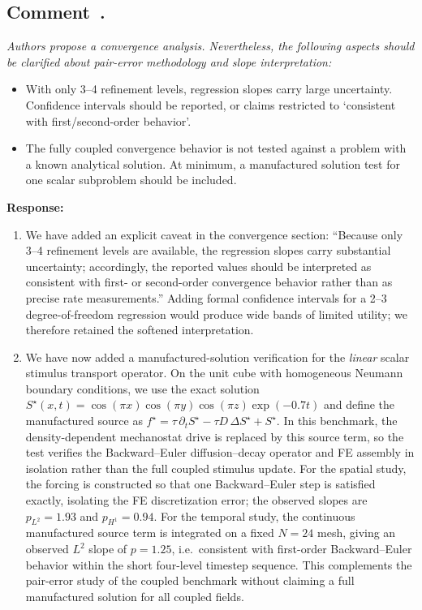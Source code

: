\documentclass[11pt,a4paper]{article}
\newcounter{reviewer}
\newcounter{comment}[reviewer]
\newcommand{\revcomment}[1]{%
  \refstepcounter{comment}%
  \subsection*{Comment~\thereviewer.\thecomment}%
  {\color{reviewerblue}\itshape #1}%
  \medskip
}
\newcommand{\response}{%
  \par\noindent\textbf{Response:}\par\noindent\color{responseblack}%
}
\begin{document}

\revcomment{Authors propose a convergence analysis. Nevertheless, the following aspects should be clarified about pair-error methodology and slope interpretation:
\begin{itemize}[nosep]
\item With only 3--4 refinement levels, regression slopes carry large uncertainty. Confidence intervals should be reported, or claims restricted to `consistent with first/second-order behavior'.
\item The fully coupled convergence behavior is not tested against a problem with a known analytical solution. At minimum, a manufactured solution test for one scalar subproblem should be included.
\end{itemize}}

\response
\begin{enumerate}[nosep]
\item We have added an explicit caveat in the convergence section: ``Because only 3--4 refinement levels are available, the regression slopes carry substantial uncertainty; accordingly, the reported values should be interpreted as consistent with first- or second-order convergence behavior rather than as precise rate measurements.'' Adding formal confidence intervals for a 2--3 degree-of-freedom regression would produce wide bands of limited utility; we therefore retained the softened interpretation.
\item We have now added a manufactured-solution verification for the \emph{linear} scalar stimulus transport operator. On the unit cube with homogeneous Neumann boundary conditions, we use the exact solution $S^\star(x,t)=\cos(\pi x)\cos(\pi y)\cos(\pi z)\exp(-0.7t)$ and define the manufactured source as $f^\star=\tau\,\partial_t S^\star-\tau D\,\Delta S^\star+S^\star$. In this benchmark, the density-dependent mechanostat drive is replaced by this source term, so the test verifies the Backward--Euler diffusion--decay operator and FE assembly in isolation rather than the full coupled stimulus update. For the spatial study, the forcing is constructed so that one Backward--Euler step is satisfied exactly, isolating the FE discretization error; the observed slopes are $p_{L^2}=1.93$ and $p_{H^1}=0.94$. For the temporal study, the continuous manufactured source term is integrated on a fixed $N=24$ mesh, giving an observed $L^2$ slope of $p=1.25$, i.e.\ consistent with first-order Backward--Euler behavior within the short four-level timestep sequence. This complements the pair-error study of the coupled benchmark without claiming a full manufactured solution for all coupled fields.
\end{enumerate}
\end{document}

